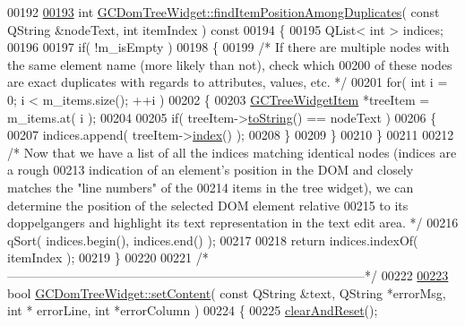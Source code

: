 \begin{DoxyCode}
00192 
\hypertarget{gcdomtreewidget_8cpp_source_l00193}{}\hyperlink{class_g_c_dom_tree_widget_a6da326993346229db9ba34fc13d7265e}{00193} \textcolor{keywordtype}{int} \hyperlink{class_g_c_dom_tree_widget_a6da326993346229db9ba34fc13d7265e}{GCDomTreeWidget::findItemPositionAmongDuplicates}( \textcolor{keyword}{const} QString &nodeText, \textcolor{keywordtype}{
      int} itemIndex )\textcolor{keyword}{ const}
00194 \textcolor{keyword}{}\{
00195   QList< int > indices;
00196 
00197   \textcolor{keywordflow}{if}( !m\_isEmpty )
00198   \{
00199     \textcolor{comment}{/* If there are multiple nodes with the same element name (more likely than
       not), check which}
00200 \textcolor{comment}{    of these nodes are exact duplicates with regards to attributes, values,
       etc. */}
00201     \textcolor{keywordflow}{for}( \textcolor{keywordtype}{int} i = 0; i < m\_items.size(); ++i )
00202     \{
00203       \hyperlink{class_g_c_tree_widget_item}{GCTreeWidgetItem} *treeItem = m\_items.at( i );
00204 
00205       \textcolor{keywordflow}{if}( treeItem->\hyperlink{class_g_c_tree_widget_item_acbd4573d56cc5c6d9bd58c461b797115}{toString}() == nodeText )
00206       \{
00207         indices.append( treeItem->\hyperlink{class_g_c_tree_widget_item_af6b48ae274cc4989811ef44944c8ad76}{index}() );
00208       \}
00209     \}
00210   \}
00211 
00212   \textcolor{comment}{/* Now that we have a list of all the indices matching identical nodes
       (indices are a rough}
00213 \textcolor{comment}{    indication of an element's position in the DOM and closely matches the
       "line numbers" of the}
00214 \textcolor{comment}{    items in the tree widget), we can determine the position of the selected
       DOM element relative}
00215 \textcolor{comment}{    to its doppelgangers and highlight its text representation in the text edit
       area. */}
00216   qSort( indices.begin(), indices.end() );
00217 
00218   \textcolor{keywordflow}{return} indices.indexOf( itemIndex );
00219 \}
00220 
00221 \textcolor{comment}{/*
      --------------------------------------------------------------------------------------*/}
00222 
\hypertarget{gcdomtreewidget_8cpp_source_l00223}{}\hyperlink{class_g_c_dom_tree_widget_a7bcd409950b7e72202426ac0c42c9476}{00223} \textcolor{keywordtype}{bool} \hyperlink{class_g_c_dom_tree_widget_a7bcd409950b7e72202426ac0c42c9476}{GCDomTreeWidget::setContent}( \textcolor{keyword}{const} QString &text, QString *errorMsg, \textcolor{keywordtype}{int} *
      errorLine, \textcolor{keywordtype}{int} *errorColumn )
00224 \{
00225   \hyperlink{class_g_c_dom_tree_widget_a3716c84a2a4fadc653cfac157caa215d}{clearAndReset}();

\end{DoxyCode}
